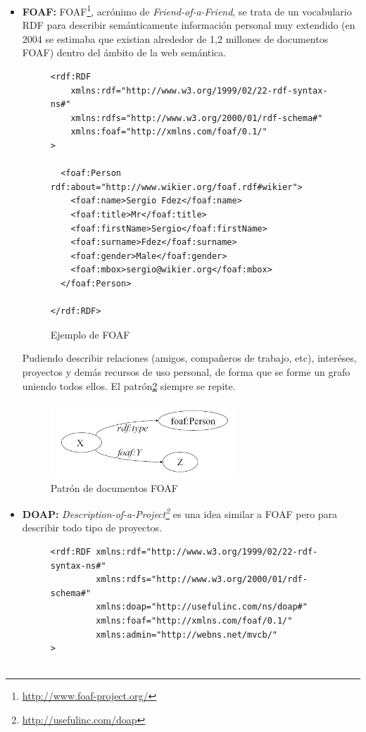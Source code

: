 \begin{itemize}
  \item \textbf{FOAF:} FOAF\footnote{\url{http://www.foaf-project.org/}}, acrónimo de 
	\emph{Friend-of-a-Friend}, se trata de un vocabulario RDF para describir 
	semánticamente información personal muy extendido (en 2004 se estimaba\cite{Li2005} 
	que existian alrededor de 1,2 millones de documentos FOAF) dentro del ámbito 
	de la web semántica.

\begin{figure} [H]
\lstset{language=XML}
\begin{lstlisting}
<rdf:RDF
	xmlns:rdf="http://www.w3.org/1999/02/22-rdf-syntax-ns#"
	xmlns:rdfs="http://www.w3.org/2000/01/rdf-schema#"
	xmlns:foaf="http://xmlns.com/foaf/0.1/"
>

  <foaf:Person rdf:about="http://www.wikier.org/foaf.rdf#wikier">
    <foaf:name>Sergio Fdez</foaf:name>
    <foaf:title>Mr</foaf:title>
    <foaf:firstName>Sergio</foaf:firstName>
    <foaf:surname>Fdez</foaf:surname>
    <foaf:gender>Male</foaf:gender>
    <foaf:mbox>sergio@wikier.org</foaf:mbox>
  </foaf:Person>

</rdf:RDF>
\end{lstlisting}
\caption{Ejemplo de FOAF}
\label{fig:ejemplo.foaf}
\end{figure}

	Pudiendo describir relaciones (amigos, compañeros de trabajo, etc), interéses,
	proyectos y demás recursos de uso personal, de forma que se forme un grafo 
	uniendo todos ellos. El patrón\ref{fig:patternFOAF} siempre se repite.

	\begin{figure}[H]
		\centering
		\includegraphics[width=7cm]{images/patron-foaf.png}
		\caption{Patrón de documentos FOAF}
		\label{fig:patternFOAF}
	\end{figure}

  \item \textbf{DOAP:} \emph{Description-of-a-Project\footnote{\url{http://usefulinc.com/doap}}} 
	es una idea similar a FOAF pero para describir todo tipo de proyectos.

\begin{figure}[H]
\lstset{language=XML}
\begin{lstlisting}
<rdf:RDF xmlns:rdf="http://www.w3.org/1999/02/22-rdf-syntax-ns#" 
         xmlns:rdfs="http://www.w3.org/2000/01/rdf-schema#" 
         xmlns:doap="http://usefulinc.com/ns/doap#" 
         xmlns:foaf="http://xmlns.com/foaf/0.1/" 
         xmlns:admin="http://webns.net/mvcb/" 
>


\end{lstlisting}
\end{figure}
\end{itemize}
